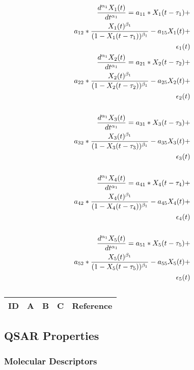 \begin{align*} 
\tiny
\frac{d^{\alpha_1}X_1(t)}{dt^{\alpha_1}} = a_{11} *X_1(t - \tau_1) + \\
a_{12} *\frac{X_1(t)^{\beta_1}}{(1-X_1(t - \tau_1))^{\beta_1}} - a_{15}X_1(t) + \\
\epsilon_1(t) \\
\frac{d^{\alpha_1}X_2(t)}{dt^{\alpha_1}} = a_{21} *X_2(t - \tau_2) + \\
a_{22} *\frac{X_2(t)^{\beta_1}}{(1-X_2(t - \tau_2))^{\beta_1}} - a_{25}X_2(t) + \\
\epsilon_2(t) \\ \\
\frac{d^{\alpha_1}X_3(t)}{dt^{\alpha_1}} = a_{31} *X_3(t - \tau_3) + \\
a_{32} *\frac{X_3(t)^{\beta_1}}{(1-X_3(t - \tau_3))^{\beta_1}} - a_{35}X_3(t) + \\
\epsilon_3(t) \\ \\
\frac{d^{\alpha_1}X_4(t)}{dt^{\alpha_1}} = a_{41} *X_4(t - \tau_4) + \\
a_{42} *\frac{X_4(t)^{\beta_1}}{(1-X_4(t - \tau_4))^{\beta_1}} - a_{45}X_4(t) + \\
\epsilon_4(t) \\ \\
\frac{d^{\alpha_1}X_5(t)}{dt^{\alpha_1}} = a_{51} *X_5(t - \tau_5) + \\
a_{52} *\frac{X_5(t)^{\beta_1}}{(1-X_5(t - \tau_5))^{\beta_1}} - a_{55}X_5(t) + \\
\epsilon_5(t) \\
\end{align*}


\centering
\begin{table}[H]\footnotesize
	\caption{}
	\begin{tabular}{rp{1cm}p{2cm}p{3cm}p{1cm}}
		\hline
		ID & A & B & C & Reference \\
		\hline
		\hline
	\end{tabular}
\end{table}
\raggedright

\subsection{QSAR Properties}

\subsubsection{Molecular Descriptors}

